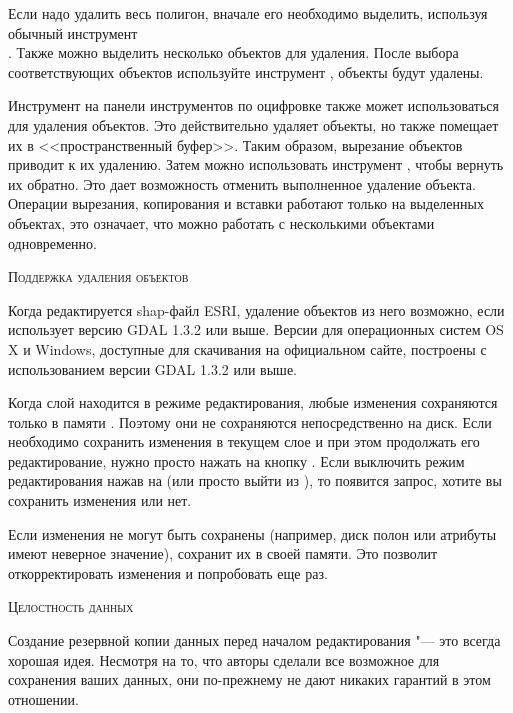
Если надо удалить весь полигон, вначале его необходимо выделить, используя
обычный инструмент \\
. Также можно
выделить несколько объектов для удаления. После выбора соответствующих
объектов используйте инструмент
, объекты будут удалены.

Инструмент  на панели
инструментов по оцифровке также может использоваться для удаления объектов.
Это действительно удаляет объекты, но также помещает их в <<пространственный
буфер>>. Таким образом, вырезание объектов приводит к их удалению. Затем можно
использовать инструмент ,
чтобы вернуть их обратно. Это дает возможность отменить выполненное удаление
объекта. Операции вырезания, копирования и вставки работают только на
выделенных объектах, это означает, что можно работать с несколькими объектами
одновременно.

\begin{Tip}\caption{\textsc{Поддержка удаления объектов}}
Когда редактируется shap-файл ESRI, удаление объектов из него возможно, если
\qg использует версию GDAL 1.3.2 или выше. Версии \qg для операционных
систем OS X и Windows, доступные для скачивания на официальном сайте,
построены с использованием версии GDAL 1.3.2 или выше.
\end{Tip}


Когда слой находится в режиме редактирования, любые изменения сохраняются
только в памяти \qg. Поэтому они не сохраняются непосредственно на диск.
Если необходимо сохранить изменения в текущем слое и при этом продолжать
его редактирование, нужно просто нажать на кнопку
. Если выключить режим
редактирования нажав на 
(или просто выйти из \qg), то появится запрос, хотите вы сохранить
изменения или нет.

Если изменения не могут быть сохранены (например, диск полон или атрибуты
имеют неверное значение), \qg сохранит их в своей памяти. Это позволит
откорректировать изменения и попробовать еще раз.

\begin{Tip}\caption{\textsc{Целостность данных}}
Создание резервной копии данных перед началом редактирования "--- это
всегда хорошая идея. Несмотря на то, что авторы \qg сделали все возможное
для сохранения ваших данных, они по-прежнему не дают никаких гарантий в
этом отношении.
\end{Tip}


